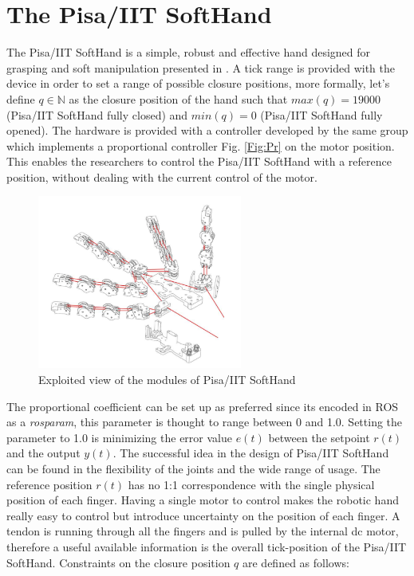\section{The Pisa/IIT SoftHand}\label{sec:softhand}
The Pisa/IIT SoftHand is a simple, robust and effective hand designed for grasping and soft manipulation presented in \cite{catalano2014adaptive}. A tick range is provided with the device in order to set a range of possible closure positions, more formally, let's define $q \in \mathbb{N}$ as the closure position of the hand such that $max(q) = 19000$ (Pisa/IIT SoftHand fully closed) and $min(q)=0$ (Pisa/IIT SoftHand fully opened). The hardware is provided with a controller developed by the same group which implements a proportional controller Fig. \ref{Fig:Pr} on the motor position. This enables the researchers to control the Pisa/IIT SoftHand with a reference position, without dealing with the current control of the motor. \\
\begin{figure}[h]
\centering
\includegraphics[width=0.6\textwidth]{Figure/softhand.png}
\caption{Exploited view of the modules of Pisa/IIT SoftHand}
\label{Fig:Softhand}
\end{figure}
The proportional coefficient can be set up as preferred since its encoded in ROS as a \textit{rosparam}, this parameter is thought to range between 0 and 1.0. Setting the parameter to 1.0 is minimizing the error value $e(t)$  between the setpoint $r(t)$ and the output $y(t)$.
The successful idea in the design of Pisa/IIT SoftHand can be found in the flexibility of the joints and the wide range of usage.
The reference position $r(t)$ has no 1:1 correspondence with the single physical position of each finger. Having a single motor to control makes the robotic hand really easy to control but introduce uncertainty on the position of each finger. 
A tendon is running through all the fingers and is pulled by the internal dc motor, therefore a useful available information is the overall tick-position of the Pisa/IIT SoftHand. Constraints on the closure position $q$ are defined as follows:

